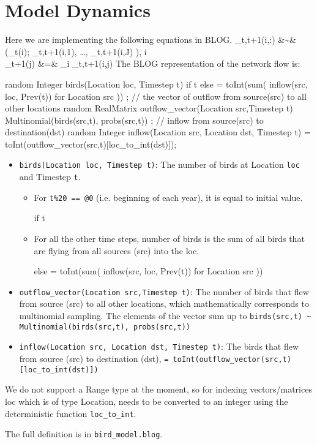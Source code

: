 \documentclass[11pt]{article}
\begin{document}
\section{Model Dynamics}
Here we are implementing the following equations in BLOG.
\beq
	_{t,t+1}(i,:) &\sim&  \left(_t(i);  \theta_{t,t+1}(i,1), \dots, \theta_{t,t+1}(i,J) \right), \forall i \in [1, I] \nn \\
	_{t+1}(j) &=& \sum_{i} _{t,t+1}(i,j)
\eeq
The BLOG representation of the network flow is:
\begin{blogcode}
random Integer birds(Location loc, Timestep t){ 
if t%
    else = toInt(sum({ inflow(src, loc, Prev(t)) for Location src })) 
}; 
// the vector of outflow from source(src) to all other locations 
random RealMatrix outflow_vector(Location src,Timestep t) ~
				Multinomial(birds(src,t), probs(src,t)) ; 
// inflow from source(src) to destination(dst) 
random Integer inflow(Location src, Location dst, Timestep t) = 
			toInt(outflow_vector(src,t)[loc_to_int(dst)]); 
\end{blogcode}
\begin{itemize}
\item \verb|birds(Location loc, Timestep t)|: The number of birds at Location \verb|loc| and Timestep \verb|t|. 
\begin{itemize}
	\item For \verb|t%20 == @0| (i.e. beginning of each year), it is equal to initial value. 
	\begin{blogcode}
  if t%
	\end{blogcode}
	\item For all the other time steps, number of birds is the sum of all birds that are flying from all sources (src) into the loc.
	\begin{blogcode}
  else = toInt(sum({ inflow(src, loc, Prev(t)) for Location src })) 
	\end{blogcode}
\end{itemize}
\item \verb|outflow_vector(Location src,Timestep t)|: The number of birds that flew from source (src) to all other locations, which mathematically corresponds to multinomial sampling. The elements of the vector sum up to \verb|birds(src,t) ~ Multinomial(birds(src,t), probs(src,t))|
\item 
\verb|inflow(Location src, Location dst, Timestep t)|: The birds that flew from source (src) to destination (dst), \verb|= toInt(outflow_vector(src,t)[loc_to_int(dst)])|
\end{itemize}
\begin{remark}
We do not support a Range type at the moment, so for indexing vectors/matrices loc which is of type Location, needs to be converted to an integer using the deterministic function \verb|loc_to_int|.
\end{remark}
The full definition is in \verb|bird_model.blog|.
\end{document}
